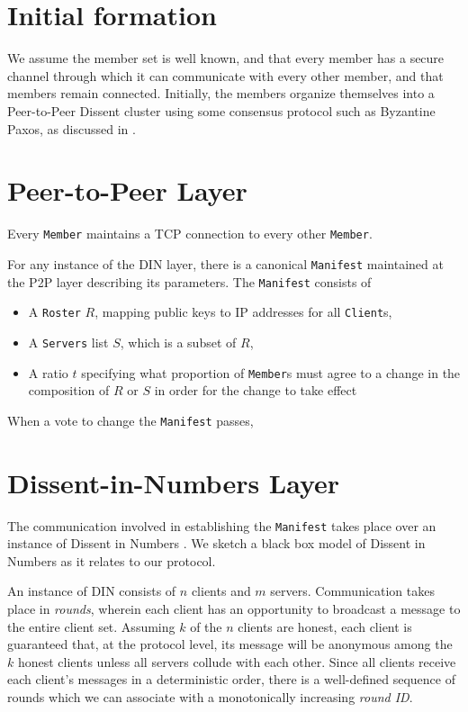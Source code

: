 \section{Initial formation}
We assume the member set is well known, and that every member has a secure
channel through which it can communicate with every other member, and that
members remain connected. Initially, the
members organize themselves into a Peer-to-Peer Dissent
cluster \cite{p2pd} using some consensus protocol such
as Byzantine Paxos, as discussed in \cite{sec}.

\section{Peer-to-Peer Layer}
Every \texttt{Member} maintains a TCP connection to every other \texttt{Member}.

For any instance of the DIN layer, there is a canonical \texttt{Manifest}
maintained at the P2P layer describing its parameters.  The \texttt{Manifest}
consists of
\begin{itemize}
  \item A \texttt{Roster} $R$, mapping public keys to IP addresses for all
    \texttt{Client}s,
  \item A \texttt{Servers} list $S$, which is a subset of $R$,
  \item A ratio $t$ specifying what proportion of \texttt{Member}s must
    agree to a change in the composition of $R$ or $S$ in order for the change
    to take effect
\end{itemize}

When a vote to change the \texttt{Manifest} passes, 

\section{Dissent-in-Numbers Layer}
The communication involved in establishing the \texttt{Manifest} takes place
over an instance of Dissent in Numbers \cite{din}. We sketch a
black box model of Dissent in Numbers as it relates to our protocol.

An instance of DIN consists of $n$ clients and $m$ servers. Communication takes
place in \emph{rounds}, wherein each client has an opportunity to broadcast a
message to the entire client set. Assuming $k$ of the $n$ clients are honest,
each client is guaranteed that, at the protocol level, its message will be
anonymous among the $k$ honest clients unless all servers collude with each
other. Since all clients receive each client's
messages in a deterministic order, there is a well-defined sequence of rounds
which we can associate with a monotonically increasing \emph{round ID}.


